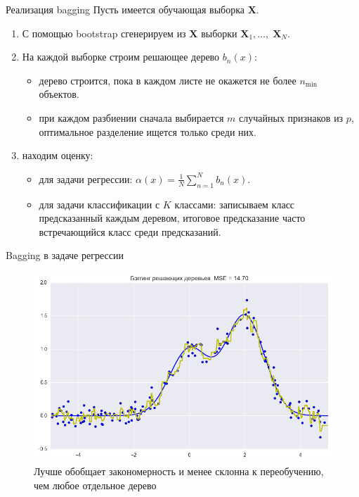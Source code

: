 \documentclass[notheorems, handout]{beamer}
\begin{document}
\begin{frame}{Реализация bagging}
	Пусть имеется обучающая выборка $\mathbf{X}$.
	\begin{enumerate}
		\item С помощью bootstrap сгенерируем из $\mathbf{X}$ выборки $\mathbf{X}_{1}, \dots,\; \mathbf{X}_{N}$.
		\item На каждой выборке строим решающее дерево $b_{n}(x)$:
			\begin{itemize}
				\item дерево строится, пока в каждом листе не окажется не более $n_{\min}$ объектов.
				\item при каждом разбиении сначала выбирается $m$ случайных признаков из $p$, оптимальное разделение ищется только среди них.
			\end{itemize}
		\item находим оценку:
			\begin{itemize}
				\item для задачи регрессии: $\alpha(x) = \frac{1}{N}\displaystyle\sum_{n = 1}^{N} b_{n}(x)$.
				\item для задачи классификации с $K$ классами: записываем класс предсказанный каждым деревом, итоговое предсказание часто встречающийся класс среди предсказаний.
			\end{itemize}
	\end{enumerate}
\end{frame}

\begin{frame}{Bagging в задаче регрессии}
	\begin{figure}[h!]
		\includegraphics[width=1 \textwidth]{img/bagging_re}
		\caption{Лучше обобщает закономерность и менее склонна к переобучению, чем любое отдельное дерево}
	\end{figure}
\end{frame}
\end{document}
